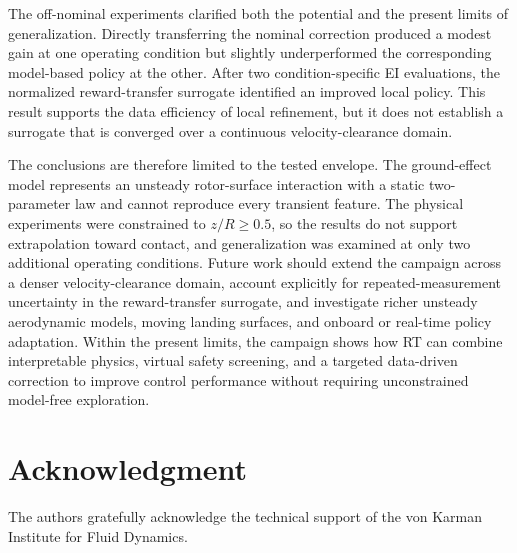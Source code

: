 \documentclass[journal]{IEEEtran}
\begin{document}
The off-nominal experiments clarified both the potential and the present limits of generalization. Directly transferring the nominal correction produced a modest gain at one operating condition but slightly underperformed the corresponding model-based policy at the other. After two condition-specific EI evaluations, the normalized reward-transfer surrogate identified an improved local policy. This result supports the data efficiency of local refinement, but it does not establish a surrogate that is converged over a continuous velocity-clearance domain.

The conclusions are therefore limited to the tested envelope. The ground-effect model represents an unsteady rotor-surface interaction with a static two-parameter law and cannot reproduce every transient feature. The physical experiments were constrained to $z/R\geq0.5$, so the results do not support extrapolation toward contact, and generalization was examined at only two additional operating conditions. Future work should extend the campaign across a denser velocity-clearance domain, account explicitly for repeated-measurement uncertainty in the reward-transfer surrogate, and investigate richer unsteady aerodynamic models, moving landing surfaces, and onboard or real-time policy adaptation. Within the present limits, the campaign shows how RT can combine interpretable physics, virtual safety screening, and a targeted data-driven correction to improve control performance without requiring unconstrained model-free exploration.

\section*{Acknowledgment}
The authors gratefully acknowledge the technical support of the von Karman Institute for Fluid Dynamics.



\end{document}
